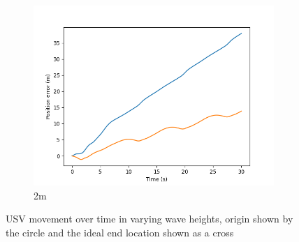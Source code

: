 \documentclass[class=article, crop=false]{standalone}
\begin{document}
\begin{figure}
\begin{subfigure}[b]{0.48\textwidth}
        \centering
        \includegraphics{scenario1/rov-0m/2.0m/usv_pos_error_uncontrolled}
        \caption{2m}
        \label{}
    \end{subfigure}
    \caption{USV movement over time in varying wave heights, origin shown by the circle and the ideal end location shown as a cross}
    \label{}
\end{figure}
\end{document}

